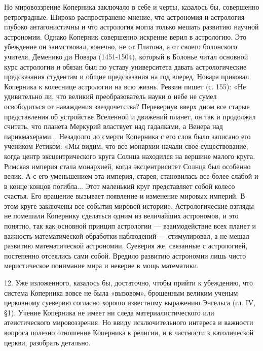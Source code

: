 Но мировоззрение Коперника заключало в себе и черты, казалось бы,
совершенно ретроградные. Широко распространено мнение, что астрономия
и астрология глубоко антагонистичны и что астрология могла только
мешать развитию научной астрономии. Однако Коперник совершенно
искренне верил в астрологию. Это убеждение он заимствовал, конечно, не
от Платона, а от своего болонского учителя, Деменико ди Новара
(1451-1504), который в Болонье читал основной курс астрологии и обязан
был по уставу университета давать астрологические предсказания
студентам и общие предсказания на год вперед. Новара приковал
Коперника к колеснице астрологии на всю жизнь. Ревзин пишет (с. 155):
«Не удивительно ли, что великий преобразователь науки о небе не сумел
освободиться от наваждения звездочетства? Перевернув вверх дном все
старые представления об устройстве Вселенной и движений планет, он так
и продолжал считать, что планета Меркурий властвует над гадалками, а
Венера над парикмахерами... Незадолго до смерти Коперника с его слов
было записано его учеником Ретиком: «Мы видим, что все монархии начали
свое существование, когда центр эксцентрического круга Солнца
находился на вершине малого круга. Римская империя стала монархией,
когда эксцентриситет Солнца был особенно велик. А с его уменьшением
эта империя, старея, становилась все более слабой и в конце концов
погибла... Этот маленький круг представляет собой колесо счастья. Его
вращение вызывает появление и изменение мировых империй. В этом круге
заключены все события мировой истории». Астрологические взгляды не
помешали Копернику сделаться одним из величайших астрономов, и это
понятно, так как основной принцип астрологии --- взаимодействие всех
планет и важность математической обработки наблюдений ---
стимулировал, а не мешал развитию математической астрономии. Суеверия
же, связанные с астрологией, постепенно отсеялись сами собой. Вредило
развитию астрономии лишь чисто меристическое понимание мира и неверие
в мощь математики.

12. Уже изложенного, казалось бы, достаточно, чтобы прийти к
убеждению, что система Коперника вовсе не была «вызовом», брошенным
великим ученым церковному суеверию согласно хорошо известному
выражению Энгельса (гл. IV, §1). Учение Коперника не имеет ни следа
материалистического или атеистического мировоззрения. Но ввиду
исключительного интереса и важности вопроса полезно отношение
Коперника к религии, и в частности к католической церкви, разобрать
детально.

